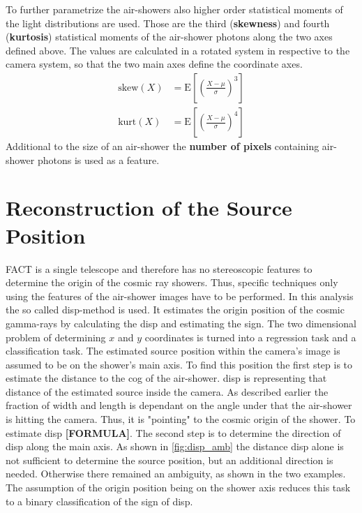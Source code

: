To further parametrize the air-showers also higher order statistical moments of
the light distributions are used. Those are the third (\textbf{skewness}) and
fourth (\textbf{kurtosis}) statistical moments of the air-shower photons along
the two axes defined above. The values are calculated in a rotated system in
respective to the camera system, so that the two main axes define the
coordinate axes.
%
\begin{align}
  \text{skew}(X) &= \text{E}\left[\left(\frac{X-\mu}{\sigma}\right)^3\right] \label{eq:skew} \\
  \text{kurt}(X) &= \text{E}\left[\left(\frac{X-\mu}{\sigma}\right)^4\right]  \label{eq:kurt}
\end{align}
%
Additional to the size of an air-shower the \textbf{number of pixels}
containing air-shower photons is used as a feature.
%
\section{Reconstruction of the Source Position}
%
FACT is a single telescope and therefore has no stereoscopic features to
determine the origin of the cosmic ray showers. Thus, specific techniques only
using the features of the air-shower images have to be performed. In this
analysis the so called disp-method is used. It estimates the origin position of
the cosmic gamma-rays by calculating the disp and estimating the sign. The two
dimensional problem of determining $x$ and $y$ coordinates is turned into a
regression task and a classification task. The estimated source position within
the camera's image is assumed to be on the shower's main axis. To find this
position the first step is to estimate the distance to the cog of the
air-shower. disp is representing that distance of the estimated source inside
the camera. As described earlier the fraction of width and length is dependant
on the angle under that the air-shower is hitting the camera. Thus, it is
"pointing" to the cosmic origin of the shower. To estimate disp
\textbf{[FORMULA]}. The second step is to determine the direction of disp along
the main axis. As shown in \autoref{fig:disp_amb} the distance disp alone is
not sufficient to determine the source position, but an additional direction is
needed. Otherwise there remained an ambiguity, as shown in the two examples.
The assumption of the origin position being on the shower axis reduces this
task to a binary classification of the sign of disp.
%
